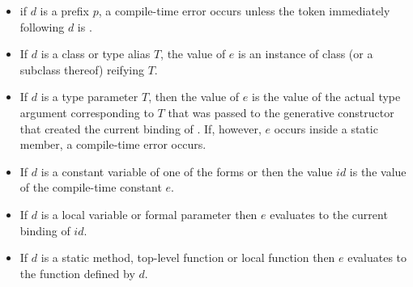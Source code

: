 \documentclass{article}
\begin{document}
\begin{itemize}
\item if $d$ is a prefix $p$, a compile-time error occurs unless the token immediately following $d$ is .
\item If $d$ is a class or type alias $T$, the value of $e$ is an instance of class  (or a subclass thereof) reifying $T$.
\item If $d$ is a type parameter $T$, then the value of $e$ is the value of the actual type argument corresponding to $T$ that was passed to the generative constructor that created the current binding of \THIS{}.
If, however, $e$ occurs inside a static member, a compile-time error occurs.

\item If $d$ is a constant variable of one of the forms  or  then the value $id$ is the value of the compile-time constant $e$.
\item If $d$ is a local variable or formal parameter then $e$ evaluates to the current binding of $id$.
\item If $d$ is a static method, top-level function or local function then $e$ evaluates to the function defined by $d$.

\end{itemize}
\end{document}
